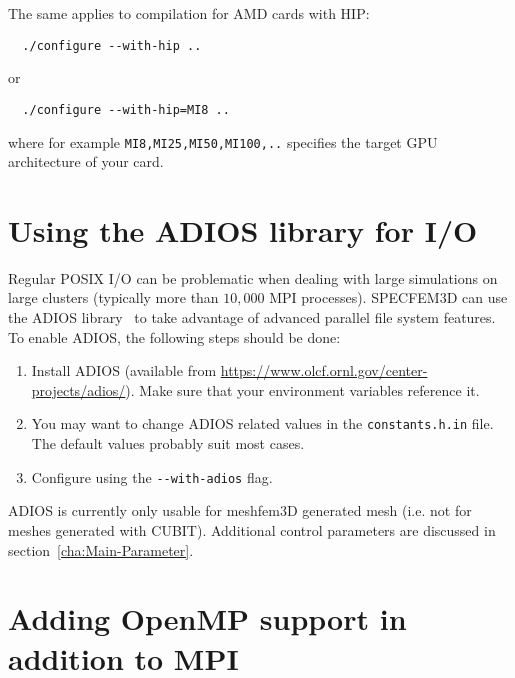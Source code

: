 The same applies to compilation for AMD cards with HIP:
\begin{verbatim}
  ./configure --with-hip ..
\end{verbatim}
or
\begin{verbatim}
  ./configure --with-hip=MI8 ..
\end{verbatim}
where for example \texttt{MI8,MI25,MI50,MI100,..} specifies the target GPU architecture of your card.\\

\section{Using the ADIOS library for I/O}

Regular POSIX I/O can be problematic when dealing with large simulations on large
clusters (typically more than $10,000$ MPI processes). SPECFEM3D can use the ADIOS library~\cite{Liu2013}
to take advantage of advanced parallel file system features. To enable
ADIOS, the following steps should be done:
\begin{enumerate}
\item Install ADIOS (available from \url{https://www.olcf.ornl.gov/center-projects/adios/}).
Make sure that your environment variables reference it.
\item You may want to change ADIOS related values in the \texttt{constants.h.in} file.
The default values probably suit most cases.
\item Configure using the \texttt{-{}-with-adios} flag.
\end{enumerate}
ADIOS is currently only usable for meshfem3D generated mesh (i.e. not for meshes generated
with CUBIT). Additional control parameters are discussed in section~\ref{cha:Main-Parameter}.

\section{Adding OpenMP support in addition to MPI}

